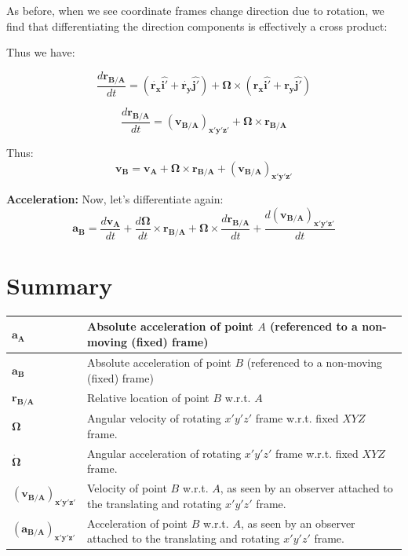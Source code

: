 \documentclass[12pt,letterpaper,twoside]{report}
\begin{document}
As before, when we see coordinate frames change direction due to rotation, we find that differentiating the direction components is effectively a cross product: 

\vspace*{8\baselineskip}

Thus we have:

\[
\frac {d \bm{r_{B/A}}} {dt} = (\bm{\dot{r_x} \hat{i'}} + \bm{\dot{r_y} \hat{j'}}) + \bm{\Omega} \times (\bm{r_x \hat{i'}} + \bm{{r_y} \hat{j'}})
\]

\vspace*{2\baselineskip}
\[
\frac {d \bm{r_{B/A}}} {dt} = \bm{(v_{B/A})_{x'y'z'}} + \bm{\Omega} \times \bm{r_{B/A}}
\]
\vspace*{2\baselineskip}

Thus:
\[
\bm{v_B} = \bm{v_A} + \bm{\Omega} \times \bm{r_{B/A}} + \bm{(v_{B/A})_{x'y'z'}}
\]

\newpage

\textbf{Acceleration:} Now, let's differentiate again:
\[
\bm{a_B} = \frac{d \bm{v_A}} {dt} + \frac{d \bm{\Omega}} {dt} \times \bm{r_{B/A}} + \bm{\Omega} \times \frac {d \bm{r_{B/A}}} {dt} + \frac{d\bm{(v_{B/A})_{x'y'z'}}}{dt}
\]

\vspace*{20\baselineskip}
\newpage

\section{Summary}

\begin{center}
\begin{tabu} to 1\textwidth {  | X[-2.5, c]  | X[1, l] | }
\hline
$\bm{a_A}$ & Absolute acceleration of point $A$ (referenced to a non-moving (fixed) frame) \\
\hline
$\bm{a_B}$ & Absolute acceleration of point $B$ (referenced to a non-moving (fixed) frame)  \\
\hline
$\bm{r_{B/A}}$ & Relative location of point $B$ w.r.t. $A$\\
\hline
$\bm{\Omega}$ & Angular velocity of rotating $x'y'z'$ frame w.r.t. fixed $XYZ$ frame. \\
\hline
$\bm{\dot{\Omega}}$ & Angular acceleration of rotating $x'y'z'$ frame w.r.t. fixed $XYZ$ frame. \\
\hline
$\bm{(v_{B/A})_{x'y'z'}}$ & Velocity of point $B$ w.r.t. $A$, as seen by an observer attached to the translating and rotating $x'y'z'$ frame. \\
\hline
$\bm{(a_{B/A})_{x'y'z'}}$ & Acceleration of point $B$ w.r.t. $A$, as seen by an observer attached to the translating and rotating $x'y'z'$ frame. \\
\hline
\end{tabu}
\end{center}
\end{document}
